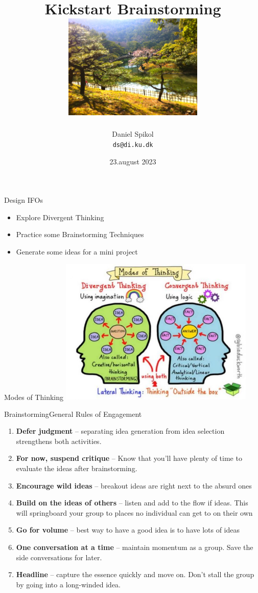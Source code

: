 \documentclass[10pt]{beamer}
\title[Kickstart-kursus] %
  {Kickstart Brainstorming\\ \includegraphics[height=5cm]{images/landscape}} %
\author{\footnotesize{Daniel Spikol} \\
          \footnotesize{\texttt{ds@di.ku.dk}}}
\institute {DIKU - Københavns Universitet}
\date[23.august 2023]{23.august 2023}
\begin{document}
\begin{frame}[plain]
\titlepage
\end{frame}


\begin{frame}{Design IFOs}
  \begin{itemize}
  \item Explore Divergent Thinking
   \item Practice some Brainstorming Techniques
  \item Generate some ideas for a mini project
  \end{itemize}
\end{frame}

	
\begin{frame}{Modes of Thinking}
\includegraphics[height=7cm]{images/modes}
\end{frame}


\begin{frame}{Brainstorming}{General Rules of Engagement}
  \begin{enumerate}
  \item \textbf{Defer judgment} – separating idea generation from idea selection strengthens both activities. 
  \item \textbf{For now, suspend critique} – Know that you’ll have plenty of time to evaluate the ideas after brainstorming. 
  \item \textbf{Encourage wild ideas} – breakout ideas are right next to the absurd ones 
  \item \textbf{Build on the ideas of others} – listen and add to the flow if ideas. This will springboard your group to places no individual can get to on their own 
  \item \textbf{Go for volume} – best way to have a good idea is to have lots of ideas 
  \item \textbf{One conversation at a time} – maintain momentum as a group. Save the side conversations for later. 
  \item \textbf{Headline} – capture the essence quickly and move on. Don’t stall the group by going into a long-winded idea. 
    \end{enumerate}
\end{frame}
\end{document}
